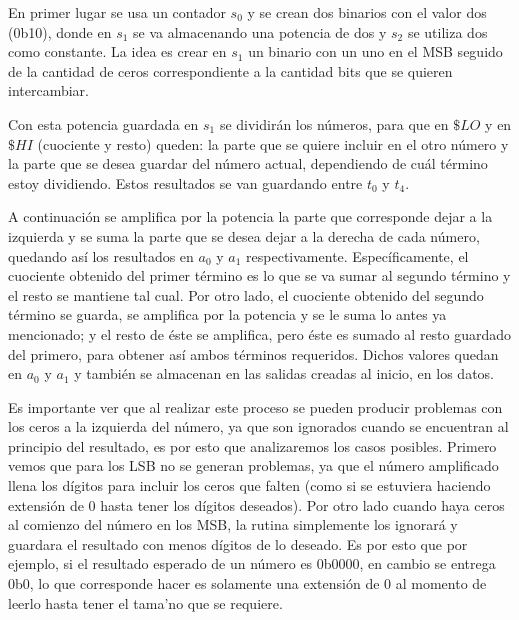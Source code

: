 \documentclass[11pt,letterpaper]{article}
\begin{document}
En primer lugar se usa un contador $s_0$ y se crean dos binarios con el valor dos (0b10), donde en $s_1$ se va almacenando una potencia de dos y $s_2$ se utiliza dos como constante. La idea es crear en $s_1$ un binario con un uno en el MSB seguido de la cantidad de ceros correspondiente a la cantidad bits que se quieren intercambiar.

Con esta potencia guardada en $s_1$ se dividirán los números, para que en $\$LO$ y en $\$HI$ (cuociente y resto) queden: la parte que se quiere incluir en el otro número y la parte que se desea guardar del número actual, dependiendo de cuál término estoy dividiendo. Estos resultados se van guardando entre $t_0$ y $t_4$.

A continuación se amplifica por la potencia la parte que corresponde dejar a la izquierda y se suma la parte que se desea dejar a la derecha de cada número, quedando así los resultados en $a_0$ y $a_1$ respectivamente. Específicamente, el cuociente obtenido del primer término es lo que se va sumar al segundo término y el resto se mantiene tal cual. Por otro lado, el cuociente obtenido del segundo término se guarda, se amplifica por la potencia y se le suma lo antes ya mencionado; y el resto de éste se amplifica, pero éste es sumado al resto guardado del primero, para obtener así ambos términos requeridos. Dichos valores quedan en $a_0$ y $a_1$ y también se almacenan en las salidas creadas al inicio, en los datos.

Es importante ver que al realizar este proceso se pueden producir problemas con los ceros a la izquierda del número, ya que son ignorados cuando se encuentran al principio del resultado, es por esto que analizaremos los casos posibles. Primero vemos que para los LSB no se generan problemas, ya que el número amplificado llena los dígitos para incluir los ceros que falten (como si se estuviera haciendo extensión de $0$ hasta tener los dígitos deseados). Por otro lado cuando haya ceros al comienzo del número en los MSB, la rutina simplemente los ignorará y guardara el resultado con menos dígitos de lo deseado. Es por esto que por ejemplo, si el resultado esperado de un número es 0b0000, en cambio se entrega 0b0, lo que corresponde hacer es solamente una extensión de $0$ al momento de leerlo hasta tener el tama'no que se requiere.
\end{document}
